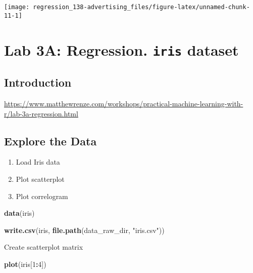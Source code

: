 \documentclass[]{book}
\newenvironment{Shaded}{\begin{snugshade}}{\end{snugshade}}
\newcommand{\DecValTok}[1]{\textcolor[rgb]{0.00,0.00,0.81}{#1}}
\newcommand{\KeywordTok}[1]{\textcolor[rgb]{0.13,0.29,0.53}{\textbf{#1}}}
\newcommand{\NormalTok}[1]{#1}
\newcommand{\OperatorTok}[1]{\textcolor[rgb]{0.81,0.36,0.00}{\textbf{#1}}}
\newcommand{\StringTok}[1]{\textcolor[rgb]{0.31,0.60,0.02}{#1}}
\providecommand{\tightlist}{%
  \setlength{\itemsep}{0pt}\setlength{\parskip}{0pt}}
\begin{document}
\begin{center}\texttt{[image: regression\_138-advertising\_files/figure-latex/unnamed-chunk-11-1]} \end{center}

\hypertarget{lab-3a-regression.-iris-dataset}{%
\chapter{\texorpdfstring{Lab 3A: Regression. \texttt{iris} dataset}{Lab 3A: Regression. iris dataset}}\label{lab-3a-regression.-iris-dataset}}

\hypertarget{introduction-1}{%
\section{Introduction}\label{introduction-1}}

\url{https://www.matthewrenze.com/workshops/practical-machine-learning-with-r/lab-3a-regression.html}

\hypertarget{explore-the-data}{%
\section{Explore the Data}\label{explore-the-data}}

\begin{enumerate}
\def\labelenumi{\arabic{enumi}.}
\tightlist
\item
  Load Iris data
\item
  Plot scatterplot
\item
  Plot correlogram
\end{enumerate}

\begin{Shaded}
\begin{Highlighting}[]
\KeywordTok{data}\NormalTok{(iris)}
\end{Highlighting}
\end{Shaded}

\begin{Shaded}
\begin{Highlighting}[]
\KeywordTok{write.csv}\NormalTok{(iris, }\KeywordTok{file.path}\NormalTok{(data_raw_dir, }\StringTok{"iris.csv"}\NormalTok{))}
\end{Highlighting}
\end{Shaded}

Create scatterplot matrix

\begin{Shaded}
\begin{Highlighting}[]
\KeywordTok{plot}\NormalTok{(iris[}\DecValTok{1}\OperatorTok{:}\DecValTok{4}\NormalTok{])}
\end{Highlighting}
\end{Shaded}
\end{document}
